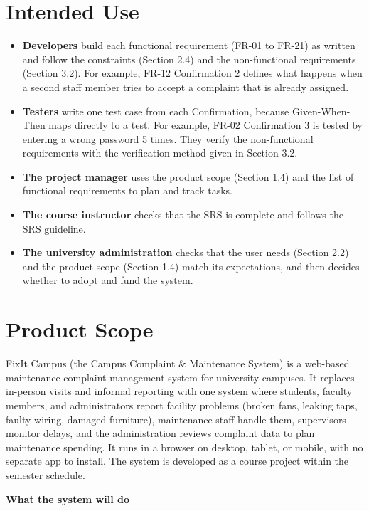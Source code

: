 \section{Intended Use}
\begin{itemize}
  \item \textbf{Developers} build each functional requirement (FR-01 to FR-21) as written and follow the constraints (Section 2.4) and the non-functional requirements (Section 3.2). For example, FR-12 Confirmation 2 defines what happens when a second staff member tries to accept a complaint that is already assigned.
  \item \textbf{Testers} write one test case from each Confirmation, because Given-When-Then maps directly to a test. For example, FR-02 Confirmation 3 is tested by entering a wrong password 5 times. They verify the non-functional requirements with the verification method given in Section 3.2.
  \item \textbf{The project manager} uses the product scope (Section 1.4) and the list of functional requirements to plan and track tasks.
  \item \textbf{The course instructor} checks that the SRS is complete and follows the SRS guideline.
  \item \textbf{The university administration} checks that the user needs (Section 2.2) and the product scope (Section 1.4) match its expectations, and then decides whether to adopt and fund the system.
\end{itemize}

\section{Product Scope}
FixIt Campus (the Campus Complaint \& Maintenance System) is a web-based maintenance complaint management system for university campuses. It replaces in-person visits and informal reporting with one system where students, faculty members, and administrators report facility problems (broken fans, leaking taps, faulty wiring, damaged furniture), maintenance staff handle them, supervisors monitor delays, and the administration reviews complaint data to plan maintenance spending. It runs in a browser on desktop, tablet, or mobile, with no separate app to install. The system is developed as a course project within the semester schedule.

\textbf{What the system will do}


